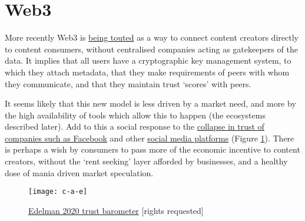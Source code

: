 \section{Web3}
More recently Web3 is \href{https://trends.google.com/trends/explore?date=all&q=web3}{being touted} as a way to connect content creators directly to content consumers, without centralised companies acting as gatekeepers of the data. It implies that all users have a cryptographic key management system, to which they attach metadata, that they make requirements of peers with whom they communicate, and that they maintain trust `scores' with peers.\par
It seems likely that this new model is less driven by a market need, and more by the high availability of tools which allow this to happen (the ecosystems described later). Add to this a social response to the \href{https://finance.yahoo.com/news/meta-facebook-worst-company-of-the-year-yahoo-finance-165345819.html}{collapse in trust of companies such as Facebook} and other \href{https://reb00ted.org/tech/20220727-end-of-social-networking/}{social media platforms} (Figure \ref{fig:trustbarometer}). There is perhaps a wish by consumers to pass more of the economic incentive to content creators, without the `rent seeking' layer afforded by businesses, and a healthy dose of mania driven market speculation. 

\begin{figure}
  \centering
    \texttt{[image: c-a-e]}
  \caption{\href{https://www.edelman.com/trust/2020-trust-barometer}{Edelman 2020 trust barometer} [rights requested]}
  \label{fig:trustbarometer}
\end{figure}
